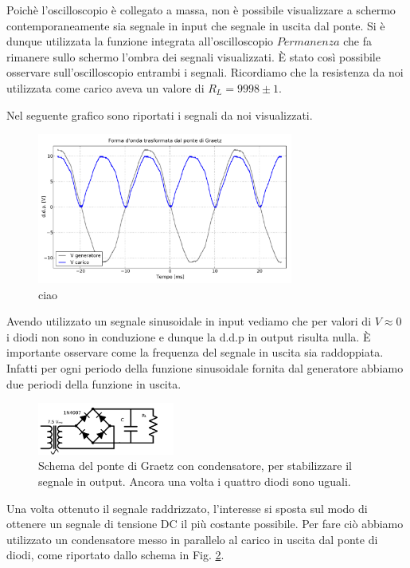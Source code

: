 Poichè l'oscilloscopio è collegato a massa, non è possibile visualizzare a schermo contemporaneamente sia segnale in input che segnale in uscita dal ponte. Si è dunque utilizzata la funzione integrata all'oscilloscopio $Permanenza$ che fa rimanere sullo schermo l'ombra dei segnali visualizzati. \`E stato così possibile osservare sull'oscilloscopio entrambi i segnali. Ricordiamo che la resistenza da noi utilizzata come carico aveva un valore di $R_L=9998 \pm 1$.

Nel seguente grafico sono riportati i segnali da noi visualizzati.

\begin{figure}[h]
\center
	\includegraphics[width=0.75\textwidth]{graetz.pdf}
	\caption{ciao}
	\label{fig:graetz}
\end{figure}

Avendo utilizzato un segnale sinusoidale in input vediamo che per valori di $V \approx 0$ i diodi non sono in conduzione e dunque la d.d.p in output risulta nulla. \`E importante osservare come la frequenza del segnale in uscita sia raddoppiata. Infatti per ogni periodo della funzione sinusoidale fornita dal generatore abbiamo due periodi della funzione in uscita.\\

\begin{figure}
	\includegraphics[width=0.4\textwidth]{schema_ripple.pdf}
	\caption{Schema del ponte di Graetz con condensatore, per stabilizzare il segnale in output. Ancora una volta i quattro diodi sono uguali.}
	\label{fig:schema_ripple}
\end{figure}

Una volta ottenuto il segnale raddrizzato, l'interesse si sposta sul modo di ottenere un segnale di tensione DC il più costante possibile. Per fare ciò abbiamo utilizzato un condensatore messo in parallelo al carico in uscita dal ponte di diodi, come riportato dallo schema in Fig. \ref{fig:schema_ripple}.

